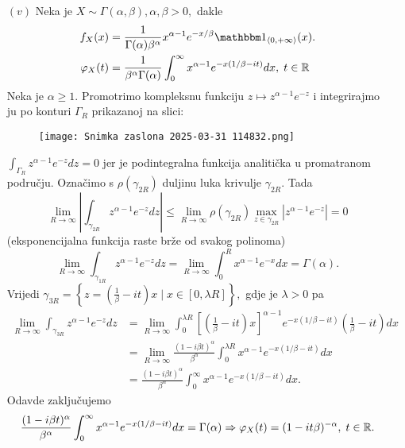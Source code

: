 \documentclass{article}
\begin{document}
\begin{enumerate}
    \item[\((v)\)] Neka je \(X\sim\Gamma(\alpha,\beta),\alpha,\beta>0,\) dakle \[\begin{aligned}f_X(x)&=\frac1{\Gamma(\alpha)\beta^\alpha}x^{\alpha-1}e^{-x/\beta}\mathbbm 1_{\langle0,+\infty\rangle}(x).\\\varphi_X(t)&=\frac1{\beta^\alpha\Gamma(\alpha)}\int_0^\infty x^{\alpha-1}e^{-x(1/\beta-it)}dx,\;t\in\Bbb R\end{aligned}\] Neka je \(\alpha\ge1.\) Promotrimo kompleksnu funkciju \(z\mapsto z^{\alpha-1}e^{-z}\) i integrirajmo ju po konturi \(\Gamma_R\) prikazanoj na slici: \begin{center}\begin{figure}
        \centering
        \texttt{[image: Snimka zaslona 2025-03-31 114832.png]}
        \caption{}
        \label{fig:enter-label}
    \end{figure}\end{center} \(\int_{\Gamma_R}z^{\alpha-1}e^{-z}dz=0\) jer je podintegralna funkcija analitička u promatranom području. Označimo s \(\rho(\gamma_{2R})\) duljinu luka krivulje \(\gamma_{2R}.\) Tada \[\lim_{R\to\infty}\left|\int_{\gamma_{2R}}z^{\alpha-1}e^{-z}dz\right|\le\lim_{R\to\infty}\rho(\gamma_{2R})\max_{z\in\gamma_{2R}}\left|z^{\alpha-1}e^{-z}\right|=0\] (eksponencijalna funkcija raste brže od svakog polinoma) \[\lim_{R\to\infty}\int_{\gamma_{1R}}z^{\alpha-1}e^{-z}dz=\lim_{R\to\infty}\int_0^Rx^{\alpha-1}e^{-x}dx=\Gamma(\alpha).\] Vrijedi \(\gamma_{3R}=\left\{z=\left(\frac1\beta-it\right)x\mid x\in[0,\lambda R]\right\},\) gdje je \(\lambda>0\) pa \[\begin{aligned}\lim_{R\to\infty}\int_{\gamma_{3R}}z^{\alpha-1}e^{-z}dz&=\lim_{R\to\infty}\int_0^{\lambda R}\left[\left(\frac1\beta-it\right)x\right]^{\alpha-1}e^{-x(1/\beta-it)}\left(\frac1\beta-it\right)dx\\&=\lim_{R\to\infty}\frac{(1-i\beta t)^\alpha}{\beta^\alpha}\int_0^{\lambda R} x^{\alpha-1}e^{-x(1/\beta-it)}dx\\&=\frac{(1-i\beta t)^\alpha}{\beta^\alpha}\int_0^\infty x^{\alpha-1}e^{-x(1/\beta-it)}dx.\end{aligned}\] Odavde zaključujemo \[\frac{(1-i\beta t)^\alpha}{\beta^\alpha}\int_0^\infty x^{\alpha-1}e^{-x(1/\beta-it)}dx=\Gamma(\alpha)\Rightarrow\varphi_X(t)=(1-it\beta)^{-\alpha},\;t\in\Bbb R.\]

\end{enumerate}
\end{document}
